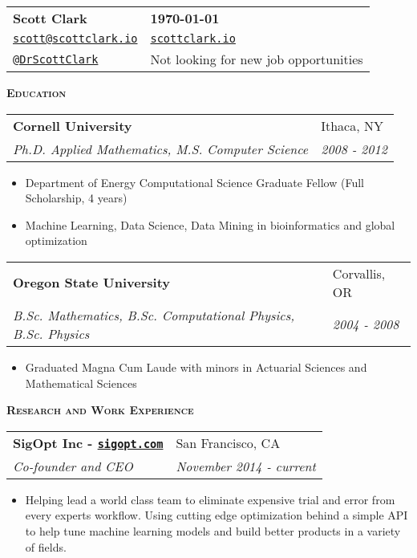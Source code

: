 \documentclass[letterpaper, 11pt]{article}
\makeatletter
\renewcommand{\section}[1]{%
  \begin{tcolorbox}
    \textsc{\textbf{\large{#1}}}
  \end{tcolorbox}
}
\newcommand{\entry}[4]{%
  \begin{tabularx}{\linewidth}{@{}Xl@{}}
    \textbf{#1} & #2          \\
    \textit{#3} & \textit{#4} \\
  \end{tabularx}
}
\newcommand{\email}[1]{\href{mailto:#1}{\texttt{#1}}}
\newcommand{\website}[1]{\href{http://#1}{\texttt{#1}}}
\newcommand{\twitter}[1]{\href{https://twitter.com/#1}{\texttt{@#1}}}
\makeatother
\begin{document}
  \begin{tabularx}{\linewidth}{@{}Xl@{}}
    \textbf{\Large{Scott Clark}} & \textbf{\today}                       \\
    \email{scott@scottclark.io}  & \website{scottclark.io}               \\
    \twitter{DrScottClark}       & Not looking for new job opportunities \\
  \end{tabularx}

  \section{Education}

  \entry{Cornell University}{Ithaca, NY}{Ph.D. Applied Mathematics, M.S. Computer Science}{2008 - 2012}
  \begin{itemize}
    \item{Department of Energy Computational Science Graduate Fellow (Full Scholarship, 4 years)}
    \item{Machine Learning, Data Science, Data Mining in bioinformatics and global optimization}
  \end{itemize}

  \entry{Oregon State University}{Corvallis, OR}{B.Sc. Mathematics, B.Sc. Computational Physics, B.Sc. Physics}{2004 - 2008}
  \begin{itemize}
    \item{Graduated Magna Cum Laude with minors in Actuarial Sciences and Mathematical Sciences}
  \end{itemize}

  \section{Research and Work Experience}

  \entry{SigOpt Inc - \website{sigopt.com}}{San Francisco, CA}{Co-founder and CEO}{November 2014 - current}
  \begin{itemize}
    \item{Helping lead a world class team to eliminate expensive trial and error from every experts workflow. Using cutting edge optimization behind a simple API to help tune machine learning models and build better products in a variety of fields.}
  \end{itemize}
\end{document}

